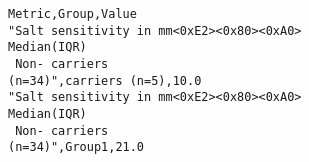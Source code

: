 \begin{verbatim}
Metric,Group,Value
"Salt sensitivity in mm<0xE2><0x80><0xA0>
Median(IQR) 
 Non- carriers
(n=34)",carriers (n=5),10.0
"Salt sensitivity in mm<0xE2><0x80><0xA0>
Median(IQR) 
 Non- carriers
(n=34)",Group1,21.0
\end{verbatim}

